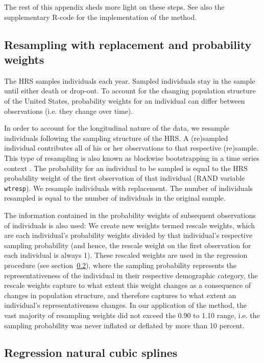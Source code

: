 \documentclass[11pt,oneside,a4paper]{article} %
\begin{document}
\begin{appendices}
The rest of this appendix sheds more light on these steps. See also the supplementary R-code for the implementation of the method.

\subsection{Resampling with replacement and probability weights}
The HRS samples individuals each year. Sampled individuals stay in the sample until either death or drop-out. To account for the changing population structure of the United States, probability weights for an individual can differ between observations (i.e. they change over time).

In order to account for the longitudinal nature of the data, we resample individuals following the sampling structure of the HRS. A (re)sampled individual contributes all of his or her observations to that respective (re)sample. This type of resampling is also known as blockwise bootstrapping in a time series context \citep{buhlmann1995blockwise}. The probability for an individual to be sampled is equal to the HRS probability weight of the first observation of that individual (RAND variable \texttt{wtresp}). We resample individuals with replacement. The number of individuals resampled is equal to the number of individuals in the original sample.

The information contained in the probability weights of subsequent observations of individuals is also used: We create new weights termed rescale weights, which are each individual’s probability weights divided by that individual’s respective sampling probability (and hence, the rescale weight on the first observation for each individual is always 1). These rescaled weights are used in the regression procedure (see section~\ref{app:splinesreg}), where the sampling probability represents the representativeness of the individual in their respective demographic category, the rescale weights capture to what extent this weight changes as a consequence of changes in population structure, and therefore captures to what extent an individual’s representativeness changes. In our application of the method, the vast majority of resampling weights did not exceed the 0.90 to 1.10 range, i.e. the sampling probability was never inflated or deflated by more than 10 percent.

\subsection{Regression natural cubic splines}
\label{app:splinesreg}


\end{appendices}
\end{document}
